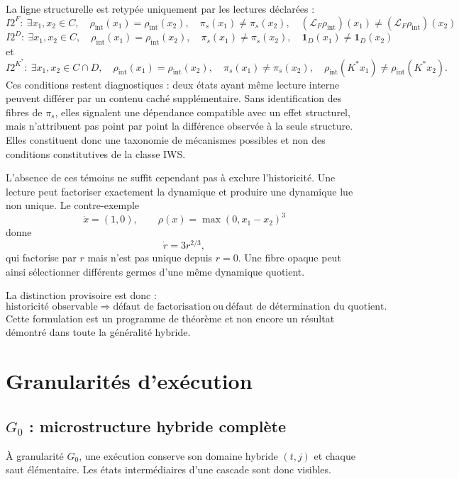 \documentclass[11pt,a4paper]{article}
\theoremstyle{definition}
\theoremstyle{remark}
\begin{document}
La ligne structurelle est retypée uniquement par les lectures déclarées :
\[
\boxed{
I2^F:\ \exists x_1,x_2\in C,\quad
\rho_{\mathrm{int}}(x_1)=\rho_{\mathrm{int}}(x_2),\quad
\pi_s(x_1)\neq\pi_s(x_2),\quad
(\mathcal L_F\rho_{\mathrm{int}})(x_1)\neq
(\mathcal L_F\rho_{\mathrm{int}})(x_2)}
\]
\[
\boxed{
I2^D:\ \exists x_1,x_2\in C,\quad
\rho_{\mathrm{int}}(x_1)=\rho_{\mathrm{int}}(x_2),\quad
\pi_s(x_1)\neq\pi_s(x_2),\quad
\mathbf 1_D(x_1)\neq\mathbf 1_D(x_2)}
\]
et
\[
\boxed{
I2^{K^*}:\ \exists x_1,x_2\in C\cap D,\quad
\rho_{\mathrm{int}}(x_1)=\rho_{\mathrm{int}}(x_2),\quad
\pi_s(x_1)\neq\pi_s(x_2),\quad
\rho_{\mathrm{int}}(K^*x_1)\neq
\rho_{\mathrm{int}}(K^*x_2)}.
\]
Ces conditions restent diagnostiques : deux états ayant même lecture interne peuvent différer par un contenu caché supplémentaire. Sans identification des fibres de $\pi_s$, elles signalent une dépendance compatible avec un effet structurel, mais n'attribuent pas point par point la différence observée à la seule structure. Elles constituent donc une taxonomie de mécanismes possibles et non des conditions constitutives de la classe IWS.

L'absence de ces témoins ne suffit cependant pas à exclure l'historicité. Une lecture peut factoriser exactement la dynamique et produire une dynamique lue non unique. Le contre-exemple
\[
\dot x=(1,0),
\qquad
\rho(x)=\max(0,x_1-x_2)^3
\]
donne
\[
\dot r=3r^{2/3},
\]
qui factorise par $r$ mais n'est pas unique depuis $r=0$. Une fibre opaque peut ainsi sélectionner différents germes d'une même dynamique quotient.

La distinction provisoire est donc :
\[
\boxed{
\text{historicité observable}
\Rightarrow
\text{défaut de factorisation}
\ \text{ou}\
\text{défaut de détermination du quotient}.}
\]
Cette formulation est un programme de théorème et non encore un résultat démontré dans toute la généralité hybride.

\section{Granularités d'exécution}

\subsection{\texorpdfstring{$G_0$}{G0} : microstructure hybride complète}

À granularité $G_0$, une exécution conserve son domaine hybride $(t,j)$ et chaque saut élémentaire. Les états intermédiaires d'une cascade sont donc visibles.
\end{document}
